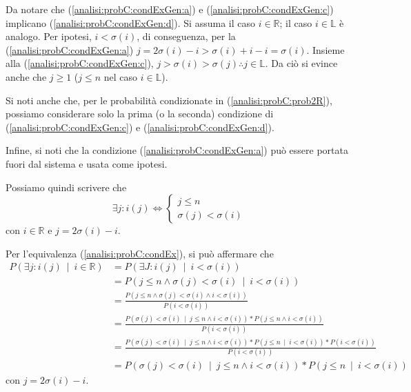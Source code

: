 \documentclass[../../../relazione.tex]{subfiles}
\begin{document}
Da notare che (\ref{analisi:probC:condExGen:a}) e (\ref{analisi:probC:condExGen:c}) implicano (\ref{analisi:probC:condExGen:d}).
Si assuma il caso $i \in \mathbb{R}$; il caso $i \in \mathbb{L}$ è analogo.
Per ipotesi, $i < \sigma(i)$, di conseguenza, per la (\ref{analisi:probC:condExGen:a}) $j = 2\sigma(i) - i > \sigma(i) + i - i = \sigma(i)$.
Insieme alla (\ref{analisi:probC:condExGen:c}), $j > \sigma(i) > \sigma(j) \therefore j \in \mathbb{L}$.
Da ciò si evince anche che $j \geq 1$ ($j \leq n$ nel caso $i \in \mathbb{L}$).

Si noti anche che, per le probabilità condizionate in (\ref{analisi:probC:prob2R}), possiamo considerare solo la prima (o la seconda) condizione di (\ref{analisi:probC:condExGen:c}) e (\ref{analisi:probC:condExGen:d}).

Infine, si noti che la condizione (\ref{analisi:probC:condExGen:a}) può essere portata fuori dal sistema e usata come ipotesi.

Possiamo quindi scrivere che
\begin{equation}\label{analisi:probC:condEx}
  \exists j : i(j) \iff
  \begin{cases}
    j \leq n \\
    \sigma(j) < \sigma(i)
  \end{cases}
\end{equation}
con $i \in \mathbb{R}$ e $j = 2\sigma(i) - i$.

Per l'equivalenza (\ref{analisi:probC:condEx}), si può affermare che
\begin{equation}\label{analisi:probC:chainRule}
  \begin{split}
    P(\exists j : i(j)\ \mid\ i \in \mathbb{R})
    &= P(\exists J : i(j)\ \mid\ i < \sigma(i)) \\
    &= P(j \leq n \wedge \sigma(j) < \sigma(i)\ \mid\ i < \sigma(i)) \\
    &= \frac{P(j \leq n \wedge \sigma(j) < \sigma(i) \wedge i < \sigma(i))}{P(i < \sigma(i))} \\
    &= \frac{P(\sigma(j) < \sigma(i)\ \mid\ j \leq n \wedge i < \sigma(i)) * P(j \leq n \wedge i < \sigma(i))}{P(i < \sigma(i))} \\
    &= \frac{P(\sigma(j) < \sigma(i)\ \mid\ j \leq n \wedge i < \sigma(i)) * P(j \leq n\ \mid\ i < \sigma(i)) * P(i < \sigma(i))}{P(i < \sigma(i))} \\
    &= P(\sigma(j) < \sigma(i)\ \mid\ j \leq n \wedge i < \sigma(i)) * P(j \leq n\ \mid\ i < \sigma(i))
  \end{split}
\end{equation}
con $j = 2\sigma(i) - i$.
\end{document}
